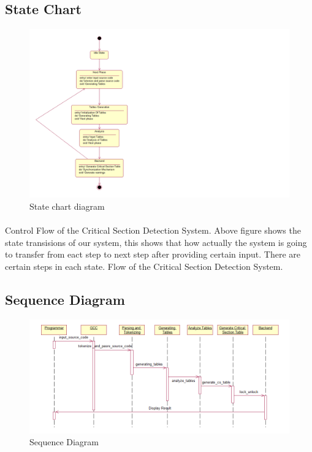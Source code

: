 \subsection{State Chart}
\begin{figure}[H]
\centering
\includegraphics[scale=0.7]{statechart.png}
\caption{State chart diagram}
\label{<<Label>>}
\end{figure}
\paragraph{}
Control Flow of the Critical Section Detection System.
Above figure shows the state transisions of our system, this shows that how actually the system is going to transfer from eact step to next step after providing certain input. There are certain steps in each state. Flow of the Critical Section Detection System.

\subsection{Sequence Diagram}
\begin{figure}[H]
\centering
\includegraphics[scale=0.5]{sequence.png}
\caption{Sequence Diagram}
\label{<<Label>>}
\end{figure}
